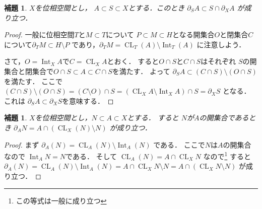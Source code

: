 \documentclass[leqno, a4paper, 12pt]{jsarticle}
\newtheorem{lem}[thm]{補題}
\DeclareMathOperator{\cl}{CL}
\DeclareMathOperator{\nai}{Int}
\numberwithin{equation}{section}
\begin{document}
\begin{lem}\label{lem:par}
$X$を位相空間とし，
$A\subset S\subset X$とする．このとき
$\partial_{S} A\subset S\cap \partial_{X}A$
が成り立つ．
\end{lem}
\begin{proof}
一般に位相空間$T$と$M\subset T$について
$P\subset M\subset H$となる開集合$O$と閉集合$C$
について$\partial_{T}M\subset H\setminus P$
であり，$\partial_{T}M=\cl_{T}(A)\setminus \nai_{T}(A)$
に注意しよう．

さて，$O=\nai_{X}A$で$C=\cl_{X}A$とおく．
すると$O\cap S$と$C\cap S$はそれぞれ
$S$の開集合と閉集合で$O\cap S\subset A\subset C\cap S$を満たす．
よって
$\partial_{S}A\subset (C\cap S)\setminus (O\cap S)$
を満たす．
ここで
$(C\cap S)\setminus (O\cap S)=
(C\setminus O)\cap S=(\cl_{X}A\setminus \nai_{X}A)\cap S=\partial_{X}S$
となる．
これは
$\partial_{S}A\subset \partial_{X}S$を意味する．
\end{proof}



\begin{lem}\label{lem:partial}
$X$を位相空間とし，$N\subset A\subset X$とする．
すると
$N$が$A$の開集合であるとき
$\partial_{A} N=A\cap (\cl_{X}(N)\setminus N)$
が成り立つ．
\end{lem}
\begin{proof}
まず
$\partial_{A}(N)=\cl_{A}(N)\setminus \nai_{A}(N)$
である．
ここで$N$は$A$の開集合なので
$\nai_{A}N=N$である．
そして
$\cl_{A}(N)=A\cap \cl_{X}N$
なので\footnote{この等式は一般に成り立つ}
すると
$\partial_{A}(N)=\cl_{A}(N)\setminus \nai_{A}(N)
=A\cap \cl_{X}N\setminus N=A\cap (\cl_{X}N\setminus N)$
が成り立つ．
\end{proof}
\end{document}

